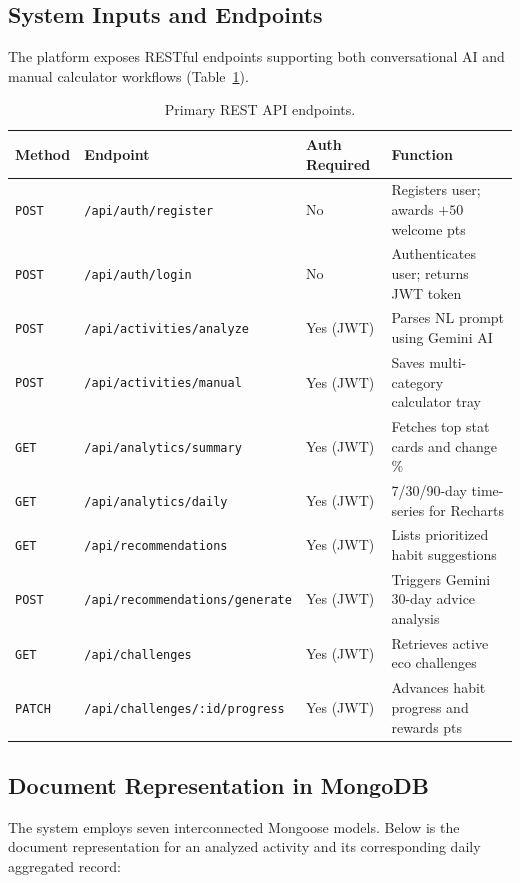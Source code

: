 \documentclass[12pt,a4paper]{article}
\begin{document}
\subsection{System Inputs and Endpoints}
The platform exposes RESTful endpoints supporting both conversational AI and manual calculator workflows (Table~\ref{tab:endpoints}).

\begin{table}[htbp]
\centering
\small
\begin{tabular}{@{}p{1.8cm}p{4.2cm}p{3.2cm}p{4.8cm}@{}}
\toprule
\textbf{Method} & \textbf{Endpoint} & \textbf{Auth Required} & \textbf{Function} \\ \midrule
\texttt{POST} & \texttt{/api/auth/register} & No & Registers user; awards $+50$ welcome pts \\ \addlinespace
\texttt{POST} & \texttt{/api/auth/login} & No & Authenticates user; returns JWT token \\ \addlinespace
\texttt{POST} & \texttt{/api/activities/analyze} & Yes (JWT) & Parses NL prompt using Gemini AI \\ \addlinespace
\texttt{POST} & \texttt{/api/activities/manual} & Yes (JWT) & Saves multi-category calculator tray \\ \addlinespace
\texttt{GET}  & \texttt{/api/analytics/summary} & Yes (JWT) & Fetches top stat cards and change \% \\ \addlinespace
\texttt{GET}  & \texttt{/api/analytics/daily} & Yes (JWT) & 7/30/90-day time-series for Recharts \\ \addlinespace
\texttt{GET}  & \texttt{/api/recommendations} & Yes (JWT) & Lists prioritized habit suggestions \\ \addlinespace
\texttt{POST} & \texttt{/api/recommendations/generate} & Yes (JWT) & Triggers Gemini 30-day advice analysis \\ \addlinespace
\texttt{GET}  & \texttt{/api/challenges} & Yes (JWT) & Retrieves active eco challenges \\ \addlinespace
\texttt{PATCH}& \texttt{/api/challenges/:id/progress} & Yes (JWT) & Advances habit progress and rewards pts \\ \bottomrule
\end{tabular}
\caption{Primary REST API endpoints.}
\label{tab:endpoints}
\end{table}

\subsection{Document Representation in MongoDB}
The system employs seven interconnected Mongoose models. Below is the document representation for an analyzed activity and its corresponding daily aggregated record:
\end{document}
